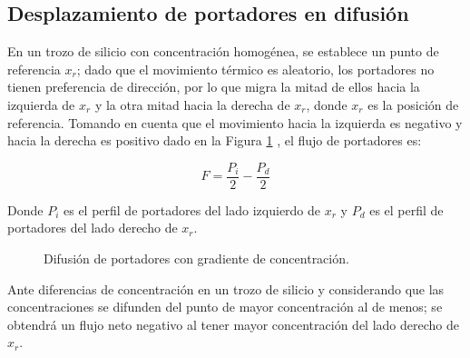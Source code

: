 \subsection{Desplazamiento de portadores en difusión}

En un trozo de silicio con concentración homogénea, se establece un punto de referencia $x_{r}$; dado que el movimiento térmico es aleatorio, los portadores no tienen preferencia de dirección, por lo que migra la mitad de ellos hacia la izquierda de $x_{r}$ y la otra mitad hacia la derecha de $x_{r}$, donde $x_{r}$ es la posición de referencia. Tomando en cuenta que el movimiento hacia la izquierda es negativo y hacia la derecha es positivo dado en la Figura \ref{difusion_portadores} \cite{b11}, el flujo de portadores es:

\[ F = \dfrac{P_{i}}{2} - \dfrac{P_{d}}{2} \]

Donde $P_{i}$ es el perfil de portadores del lado izquierdo de $x_{r}$ y $P_{d}$ es el perfil de portadores del lado derecho de $x_{r}$.

\begin{figure}[H]
    \centering
    \caption{Difusión de portadores con gradiente de concentración.}
    \label{difusion_portadores}
\end{figure}

Ante diferencias de concentración en un trozo de silicio y considerando que las concentraciones se difunden del punto de mayor concentración al de menos; se obtendrá un flujo neto negativo al tener mayor concentración del lado derecho de $x_{r}$.

